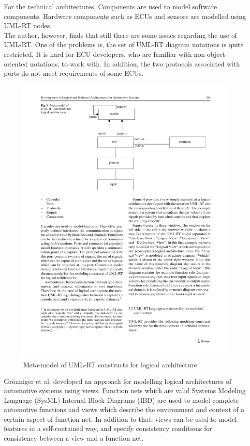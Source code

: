 For the technical architectures, Components are used to model software components. Hardware components such as ECUs and sensors are modelled using UML-RT nodes. \\

The author, however, finds that still there are some issues regarding the use of UML-RT. One of the problems is, the set of UML-RT diagram notations is quite restricted. It is hard for ECU developers, who are familiar with non-object-oriented notations, to work with. In addition, the two protocols associated with ports do not meet requirements of some ECUs.

\begin{figure}[H]
\centering
\captionsetup{justification=centering}
\vspace{0cm}%
\includegraphics[width=0.55\linewidth]{figure/literatures/beeck_metalmodel.pdf}
\caption{Meta-model of UML-RT constructs for logical architecture \cite{Beeck}}
\label{fig:beeck_metalmodel}
\end{figure}

Grönniger et al. \cite{Grönniger} developed an approach for modelling logical architectures of automotive systems using views. Function nets which are valid Systems Modeling Language (SysML) Internal Block Diagrams (IBD) are used to model complete automotive functions and views which describe the environment and context of a certain aspect of function net. In addition to that, views can be used to model features in a self-contained way, and specify consistency conditions for consistency between a view and a function net.

